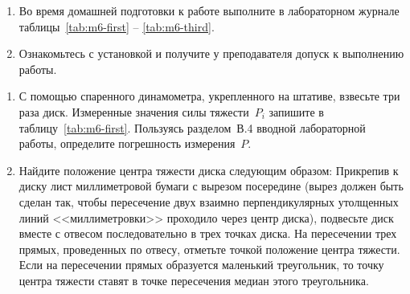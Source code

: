 \documentclass[a4paper, 12pt]{extarticle}
\begin{document}
\begin{enumerate}
\item Во время домашней подготовки к  работе  выполните в лабораторном журнале таблицы~\ref{tab:m6-first} -- \ref{tab:m6-third}.
\item Ознакомьтесь с установкой и получите у преподавателя допуск к выполнению работы.
\end{enumerate}

\begin{enumerate}
\item
С помощью спаренного динамометра, укрепленного на штативе,
взвесьте три раза диск. Измеренные значения силы тяжести~$P_i$ запишите в таблицу~\ref{tab:m6-first}. %
Пользуясь разделом~В.4 вводной лабораторной работы, определите погрешность измерения~$P$.


\item
Найдите положение центра тяжести диска следующим образом: %
Прикрепив к диску лист миллиметровой бумаги с вырезом посередине (вырез должен быть сделан так, чтобы пересечение двух взаимно перпендикулярных утолщенных линий <<миллиметровки>> проходило через центр диска), подвесьте диск вместе с отвесом последовательно в трех точках диска. На пересечении трех прямых, проведенных по отвесу, отметьте точкой положение центра тяжести. Если на пересечении прямых образуется маленький треугольник, то точку центра тяжести ставят в точке пересечения медиан этого треугольника.

\end{enumerate}
\end{document}
